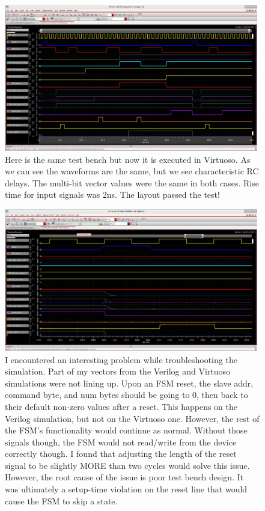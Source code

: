 \documentclass[11pt]{article}
\begin{document}
\begin{figure}[H]
    \centering
\includegraphics[width=0.99\textwidth]{waveforms.png}
    \caption{Here is the same test bench but now it is executed in Virtuoso. As we can see the waveforms are the same, but we see characteristic RC delays. The multi-bit vector values were the same in both cases. Rise time for input signals was 2ns. The layout passed the test!}
\end{figure}


\begin{figure}[H]
    \centering
\includegraphics[width=0.99\textwidth]{disc1.png}
    \caption{I encountered an interesting problem while troubleshooting the simulation. Part of my vectors from the Verilog and Virtuoso simulations were not lining up. Upon an FSM reset, the slave addr, command byte, and num bytes should be going to 0, then back to their default non-zero values after a reset. This happens on the Verilog simulation, but not on the Virtuoso one. However, the rest of the FSM's functionality would continue as normal. Without those signals though, the FSM would not read/write from the device correctly though. I found that adjusting the length of the reset signal to be slightly MORE than two cycles would solve this issue. However, the root cause of the issue is poor test bench design. It was ultimately a setup-time violation on the reset line that would cause the FSM to skip a state. }
\end{figure}
\end{document}
